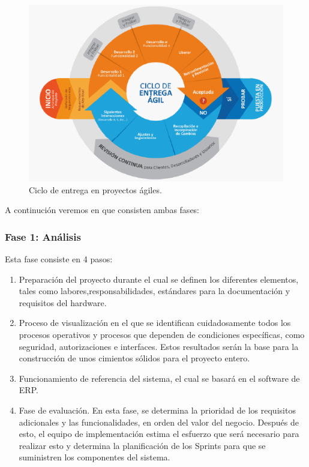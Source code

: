 \begin{figure}[h]
	\centering
	\includegraphics[width=1\textwidth]{img/metodologia-agil}
	\caption{Ciclo de entrega en proyectos ágiles.}
	\label{fig:metodologia-agil}
\end{figure}

A continución veremos en que consisten ambas fases:

\subsubsection{Fase 1: Análisis} \label{sssec:fase-analisis}
Esta fase consiste en 4 pasos:
\begin{enumerate}
	\item Preparación del proyecto durante el cual se definen los diferentes elementos, tales como labores,responsabilidades, estándares para la documentación y requisitos del hardware.
	\item Proceso de visualización en el que se identifican cuidadosamente todos los procesos operativos y procesos que dependen de condiciones específicas, como seguridad, autorizaciones e interfaces. Estos resultados serán la base para la construcción de unos cimientos sólidos para el proyecto entero.
	\item Funcionamiento de referencia del sistema, el cual se basará en el software de ERP.
	\item Fase de evaluación. En esta fase, se determina la prioridad de los requisitos adicionales y las funcionalidades, en orden del valor del negocio. Después de esto, el equipo de implementación estima el esfuerzo que será necesario para realizar esto y determina la planificación de los Sprints para que se suministren los componentes del sistema.
\end{enumerate}

